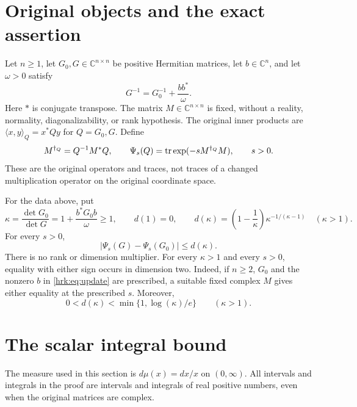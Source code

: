 \documentclass[11pt]{article}
\begin{document}
\section{Original objects and the exact assertion}
Let $n\geq1$, let $G_0,G\in\mathbb C^{n\times n}$ be positive
Hermitian matrices, let $b\in\mathbb C^n$, and let $\omega>0$ satisfy
\begin{equation}\label{hrk:eq:update}
 G^{-1}=G_0^{-1}+\frac{bb^*}{\omega}.
\end{equation}
Here $*$ is conjugate transpose. The matrix $M\in\mathbb C^{n\times n}$
is fixed, without a reality, normality, diagonalizability, or rank
hypothesis. The original inner products are
$\langle x,y\rangle_Q=x^*Qy$ for $Q=G_0,G$. Define
\begin{equation}\label{hrk:eq:original-observable}
 M^{\dagger_Q}=Q^{-1}M^*Q,\qquad
 \Psi_s(Q)=\operatorname{tr}\exp(-sM^{\dagger_Q}M),\qquad s>0.
\end{equation}
These are the original operators and traces, not traces of a changed
multiplication operator on the original coordinate space.

\begin{hrktheorem}\label{hrk:thm:main}
For the data above, put
\begin{equation}\label{hrk:eq:kappa}
 \kappa=\frac{\det G_0}{\det G}
       =1+\frac{b^*G_0b}{\omega}\geq1,
 \qquad
 d(1)=0,\qquad
 d(\kappa)=\left(1-\frac1\kappa\right)
                    \kappa^{-1/(\kappa-1)}\quad(\kappa>1).
\end{equation}
For every $s>0$,
\begin{equation}\label{hrk:eq:sharp-bound}
 \left|\Psi_s(G)-\Psi_s(G_0)\right|\leq d(\kappa).
\end{equation}
There is no rank or dimension multiplier. For every $\kappa>1$ and
every $s>0$, equality with either sign occurs in dimension two.
Indeed, if $n\geq2$, $G_0$ and the nonzero $b$ in
\eqref{hrk:eq:update} are prescribed, a suitable fixed complex $M$ gives
either equality at the prescribed $s$. Moreover,
\begin{equation}\label{hrk:eq:strict-improvement}
 0<d(\kappa)<\min\{1,\log(\kappa)/e\}\qquad(\kappa>1).
\end{equation}
\end{hrktheorem}

\section{The scalar integral bound}
The measure used in this section is $d\mu(x)=dx/x$ on $(0,\infty)$.
All intervals and integrals in the proof are intervals and integrals of
real positive numbers, even when the original matrices are complex.
\end{document}
